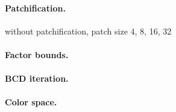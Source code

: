\paragraph{Patchification.} 

without patchification, patch size 4, 8, 16, 32

\paragraph{Factor bounds.} 

\paragraph{BCD iteration.}

\paragraph{Color space.}


